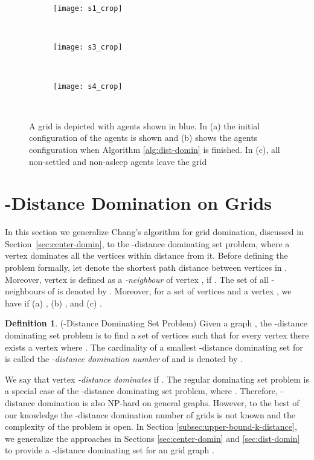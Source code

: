 \documentclass[letterpaper, 10pt, conference]{ieeeconf}
\theoremstyle{definition}
\newtheorem{definition}[theorem]{Definition}
\theoremstyle{remark}
\begin{document}
\begin{figure}[t]
        \begin{subfigure}[b]{0.28\linewidth}
                \centering
                \texttt{[image: s1\_crop]}
                \caption{}
        \end{subfigure}
        ~ 
  \hfill
        \begin{subfigure}[b]{0.28\linewidth}
                \centering
                \texttt{[image: s3\_crop]}
                \caption{}
        \end{subfigure}
        ~
  \hfill
 \begin{subfigure}[b]{0.28\linewidth}
                \centering
                \texttt{[image: s4\_crop]}
                \caption{}
        \end{subfigure}
        ~
        \caption{A  grid is depicted with agents shown in blue. In (a) the initial configuration of the agents is shown and (b) shows the agents configuration when Algorithm \ref{alg:dist-domin} is finished. In (c), all non-settled and non-asleep agents leave the grid}
        \label{fig:sim1}
\end{figure}


\section{-Distance Domination on Grids}
\label{sec:k-distance}
In this section we generalize Chang's algorithm for grid domination, discussed in Section~\ref{sec:center-domin}, to the -distance dominating set problem, where a vertex dominates all the vertices within distance  from it. Before defining the problem formally, let  denote the shortest path distance between vertices  in . Moreover, vertex  is defined as a \emph{-neighbour} of vertex , if . The set of all -neighbours of  is denoted by . Moreover, for a set of vertices  and a vertex , we have  if (a) , (b) , and (c) .


\begin{definition}(-Distance Dominating Set Problem)
\label{def:k-distance}
Given a graph , the -distance dominating set problem is to find a set of vertices  such that for every vertex  there exists a vertex  where . The cardinality of a smallest -distance dominating set for  is called the \emph{-distance domination number} of  and is denoted by  \cite{Henning'98}.
\end{definition}

We say that vertex  \emph{-distance dominates}  if . The regular dominating set problem is a special case of the -distance dominating set problem, where . Therefore, -distance domination is also NP-hard on general graphs. However, to the best of our knowledge the -distance domination number of grids is not known and the complexity of the problem is open. In Section \ref{subsec:upper-bound-k-distance}, we
generalize the approaches in Sections \ref{sec:center-domin} and \ref{sec:dist-domin} to provide a -distance dominating set for an  grid graph .
\end{document}
